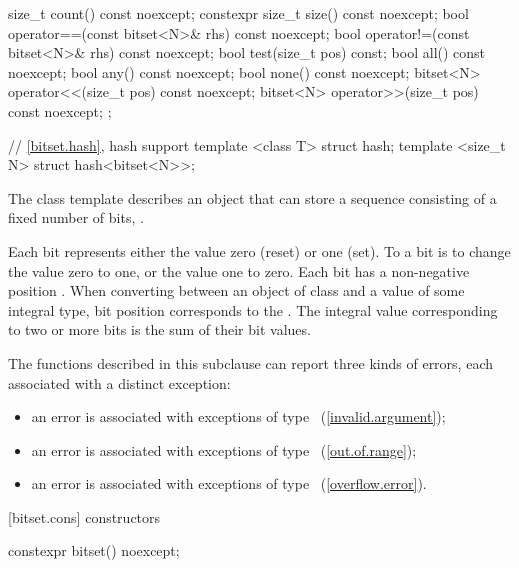 \begin{codeblock}
{{    size_t count() const noexcept;
    constexpr size_t size() const noexcept;
    bool operator==(const bitset<N>& rhs) const noexcept;
    bool operator!=(const bitset<N>& rhs) const noexcept;
    bool test(size_t pos) const;
    bool all() const noexcept;
    bool any() const noexcept;
    bool none() const noexcept;
    bitset<N> operator<<(size_t pos) const noexcept;
    bitset<N> operator>>(size_t pos) const noexcept;
  };

  // \ref{bitset.hash}, hash support
  template <class T> struct hash;
  template <size_t N> struct hash<bitset<N>>;
}
\end{codeblock}

\pnum
The class template
describes an object that can store a sequence consisting of a fixed number of
bits, .

\pnum
Each bit represents either the value zero (reset) or one (set).
To
a bit is to change the value zero to one, or the value one to
zero.
Each bit has a non-negative position .
When converting
between an object of class
and a value of some
integral type, bit position  corresponds to the
.
The integral value corresponding to two
or more bits is the sum of their bit values.

\pnum
The functions described in this subclause can report three kinds of
errors, each associated with a distinct exception:

\begin{itemize}
\item
an
error is associated with exceptions of type
~(\ref{invalid.argument});
%
\item
an
error is associated with exceptions of type
~(\ref{out.of.range});
%
\item
an
error is associated with exceptions of type
~(\ref{overflow.error}).
%
\end{itemize}

[bitset.cons]{ constructors}

%
\begin{itemdecl}
constexpr bitset() noexcept;
\end{itemdecl}

